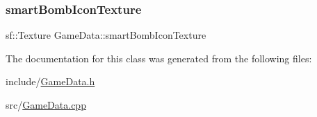\subsubsection{\texorpdfstring{smart\+Bomb\+Icon\+Texture}{smartBombIconTexture}}
{\footnotesize\ttfamily sf\+::\+Texture Game\+Data\+::smart\+Bomb\+Icon\+Texture}



The documentation for this class was generated from the following files\+:\begin{DoxyCompactItemize}
\item 
include/\hyperlink{_game_data_8h}{Game\+Data.\+h}\item 
src/\hyperlink{_game_data_8cpp}{Game\+Data.\+cpp}\end{DoxyCompactItemize}
